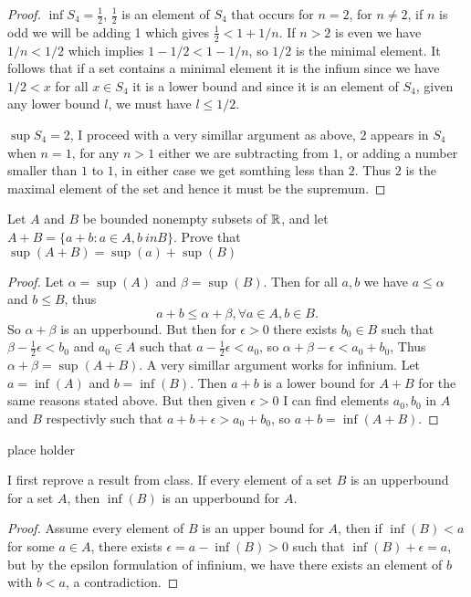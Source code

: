 \begin{proof}
$\inf S_4 = \frac{1}{2}$, $\frac{1}{2}$ is an element of $S_4$ that occurs for $n = 2$, for $n \neq 2$, if $n$ is odd we will be adding 1 which 
gives $\frac{1}{2} < 1 + 1/n$. If $n>2$ is even we have $1/n < 1/2$ which implies $1 - 1/2 < 1 - 1/n$, so $1/2$ is the minimal element. It follows that 
if a set contains a minimal element it is the infium since we have $1/2 < x$ for all $x \in S_4$ it is a lower bound and since it is an element of $S_4$, given any lower bound $l$, we must 
have $l \leq 1/2$. 

$\sup S_4 = 2$, I proceed with a very simillar argument as above, $2$ appears in $S_4$ when $n=1$, for any $n>1$ either we are subtracting from $1$, or adding a number smaller than $1$ to $1$, in either case 
we get somthing less than $2$. Thus $2$ is the maximal element of the set and hence it must be the supremum. 
\end{proof}


\question 
Let $A$ and $B$ be bounded nonempty subsets of $\mathbb{R}$, and let $A + B = \{a + b: a \in A, b\ in B\}$. 
Prove that $\sup(A+B) = \sup(a) + \sup(B)$ 

\begin{proof}
    Let $\alpha = \sup (A)$ and $\beta = \sup (B)$. Then for all $a, b$ we have 
    $a \leq \alpha$ and $b \leq B$, thus 
    \[a + b \leq \alpha + \beta, \forall a \in A, b \in B. \] 
    So $\alpha + \beta $ is an upperbound. But then for $\epsilon > 0$ there exists $b_0 \in B$ such that 
    $ \beta - \frac{1}{2}\epsilon < b_0$ and $a_0 \in A$ such that $a - \frac{1}{2}\epsilon < a_0$, so $\alpha + \beta - \epsilon < a_0 + b_0$,
    Thus $\alpha + \beta = \sup( A + B)$. 
    A very simillar argument works for infinium. Let $a = \inf(A)$ and $b = \inf(B)$. Then $a + b$ is a lower bound for $A + B$ for the same reasons stated above. 
    But then given $\epsilon > 0$ I can find elements $a_0, b_0$ in $A$ and $B$ respectivly such that $a + b + \epsilon > a_0 + b_0$, so 
    $a + b = \inf(A + B)$. 
\end{proof}

\question 
place holder 

I first reprove a result from class. If every element of a set $B$ is an upperbound for a set $A$, then $\inf(B)$ is an upperbound for $A$. 
\begin{proof}
    Assume every element of $B$ is an upper bound for $A$, then if $\inf(B) < a$ for some $a \in A$, there exists $\epsilon = a - \inf(B) > 0$ such that $\inf(B) + \epsilon = a$, but 
    by the epsilon formulation of infinium, we have there exists an element of $b$ with $b < a$, a contradiction. 
\end{proof}

